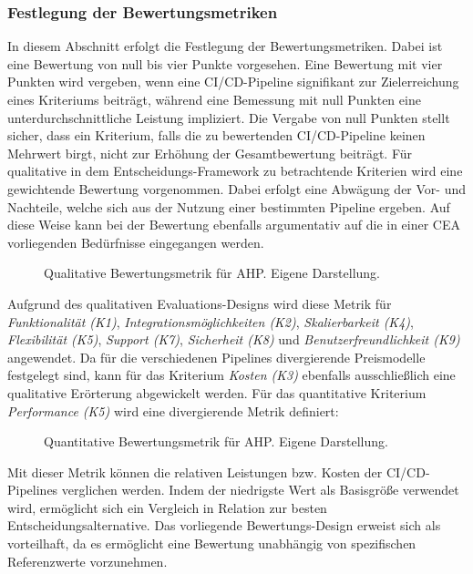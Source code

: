 \subsubsection{Festlegung der Bewertungsmetriken}
In diesem Abschnitt erfolgt die Festlegung der Bewertungsmetriken. Dabei ist eine Bewertung von null bis vier Punkte vorgesehen. Eine Bewertung mit vier Punkten wird vergeben, wenn eine CI/CD-Pipeline signifikant zur Zielerreichung eines Kriteriums beiträgt, während eine Bemessung mit null Punkten eine unterdurchschnittliche Leistung impliziert. Die Vergabe von null Punkten stellt sicher, dass ein Kriterium, falls die zu bewertenden CI/CD-Pipeline keinen Mehrwert birgt, nicht zur Erhöhung der Gesamtbewertung beiträgt. Für qualitative in dem Entscheidungs-Framework zu betrachtende Kriterien wird eine gewichtende Bewertung vorgenommen. Dabei erfolgt eine Abwägung der Vor- und Nachteile, welche sich aus der Nutzung einer bestimmten Pipeline ergeben. Auf diese Weise kann bei der Bewertung ebenfalls argumentativ auf die in einer CEA vorliegenden Bedürfnisse eingegangen werden.
\begin{center}
	\begin{figure}[H]
		\centering
		\caption[Qualitative Bewertungsmetrik für AHP]{Qualitative Bewertungsmetrik für AHP. Eigene Darstellung.}
		\label{fig:metrik}
	\end{figure}
\end{center}
\vspace*{-15mm}
Aufgrund des qualitativen Evaluations-Designs wird diese Metrik für \textit{Funktionalität (K1)}, \textit{Integrationsmöglichkeiten (K2)}, \textit{Skalierbarkeit (K4)}, \textit{Flexibilität (K5)}, \textit{Support (K7)}, \textit{Sicherheit (K8)} und \textit{Benutzerfreundlichkeit (K9)} angewendet. Da für die verschiedenen Pipelines divergierende Preismodelle festgelegt sind, kann für das Kriterium \textit{Kosten (K3)} ebenfalls ausschließlich eine qualitative Erörterung abgewickelt werden. Für das quantitative Kriterium \textit{Performance (K5)} wird eine divergierende Metrik definiert: 
\begin{center}
	\begin{figure}[H]
		\centering
		\caption[Quantitative Bewertungsmetrik für AHP]{Quantitative Bewertungsmetrik für AHP. Eigene Darstellung.}
		\label{fig:metrik_qual}
	\end{figure}
\end{center}
\vspace*{-15mm}
Mit dieser Metrik können die relativen Leistungen bzw. Kosten der CI/CD-Pipelines verglichen werden. Indem der niedrigste Wert als Basisgröße verwendet wird, ermöglicht sich ein Vergleich in Relation zur besten Entscheidungsalternative. Das vorliegende Bewertungs-Design erweist sich als vorteilhaft, da es ermöglicht eine Bewertung unabhängig von spezifischen Referenzwerte vorzunehmen.

